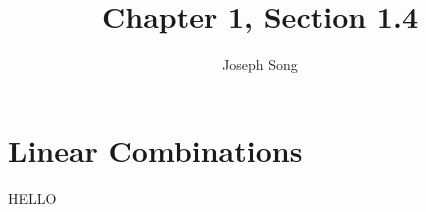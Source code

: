 \documentclass{article}
\title{Chapter 1, Section 1.4}
\author{Joseph Song}
\date{}
\begin{document}
 
\maketitle

\section{Linear Combinations}
HELLO
 
\end{document}
